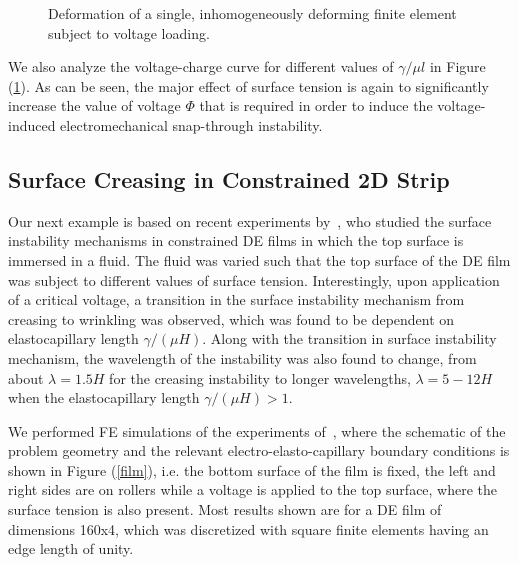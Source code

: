 \documentclass[final,authoryear,3p,times]{elsarticle}
\begin{document}
\begin{figure}
\centering
{}
	\caption{Deformation of a single, inhomogeneously deforming finite element subject to voltage loading.}
	\label{inhomo}
\end{figure}

We also analyze the voltage-charge curve for different values of $\gamma/\mu l$ in Figure (\ref{inhomo}).  As can be seen, the major effect of surface tension is again to significantly increase the value of voltage $\Phi$ that is required in order to induce the voltage-induced electromechanical snap-through instability.

\subsection{Surface Creasing in Constrained 2D Strip}

Our next example is based on recent experiments by~\citet{wangPRE2013}, who studied the surface instability mechanisms in constrained DE films in which the top surface is immersed in a fluid.  The fluid was varied such that the top surface of the DE film was subject to different values of surface tension.  Interestingly, upon application of a critical voltage, a transition in the surface instability mechanism from creasing to wrinkling was observed, which was found to be dependent on elastocapillary length $\gamma/(\mu H)$.  Along with the transition in surface instability mechanism, the wavelength of the instability was also found to change, from about $\lambda=1.5H$ for the creasing instability to longer wavelengths, $\lambda=5-12H$ when the elastocapillary length $\gamma/(\mu H)>1$.  

We performed FE simulations of the experiments of~\citet{wangPRE2013}, where the schematic of the problem geometry and the relevant electro-elasto-capillary boundary conditions is shown in Figure (\ref{film}), i.e. the bottom surface of the film is fixed, the left and right sides are on rollers while a voltage is applied to the top surface, where the surface tension is also present.   Most results shown are for a DE film of dimensions 160x4, which was discretized with square finite elements having an edge length of unity.
\end{document}
